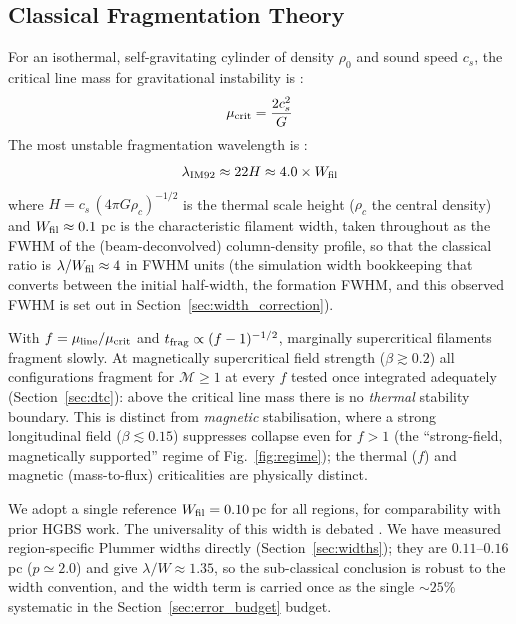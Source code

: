 \documentclass[usenatbib,twoside,twocolumn]{mnras}
\begin{document}
\subsection{Classical Fragmentation Theory}

For an isothermal, self-gravitating cylinder of density $\rho_0$ and sound speed $c_s$, the critical line mass for gravitational instability is \citep{Ostriker1964}:
\begin{equation}
\mu_{\rm crit} = \frac{2c_s^2}{G}
\end{equation}
The most unstable fragmentation wavelength is \citep{Inutsuka1992}:
\begin{equation}
\lambda_{\rm IM92} \approx 22 H \approx 4.0 \times W_{\rm fil}
\label{eq:im92}
\end{equation}
where $H = c_s\,(4\pi G\rho_c)^{-1/2}$ is the thermal scale height ($\rho_c$ the central density) and $W_{\rm fil} \approx 0.1$ pc is the characteristic filament width, taken throughout as the FWHM of the (beam-deconvolved) column-density profile, so that the classical ratio is $\lambda/W_{\rm fil}\approx4$ in FWHM units (the simulation width bookkeeping that converts between the initial half-width, the formation FWHM, and this observed FWHM is set out in Section~\ref{sec:width_correction}).

With $f=\mu_{\rm line}/\mu_{\rm crit}$ and $t_{\rm frag}\propto(f-1)^{-1/2}$, marginally supercritical filaments fragment slowly. At magnetically supercritical field strength ($\beta\gtrsim0.2$) all configurations fragment for $\mathcal{M}\geq1$ at every $f$ tested once integrated adequately (Section~\ref{sec:dtc}): above the critical line mass there is no \emph{thermal} stability boundary. This is distinct from \emph{magnetic} stabilisation, where a strong longitudinal field ($\beta\lesssim0.15$) suppresses collapse even for $f>1$ (the ``strong-field, magnetically supported'' regime of Fig.~\ref{fig:regime}); the thermal ($f$) and magnetic (mass-to-flux) criticalities are physically distinct.

We adopt a single reference $W_{\rm fil}=0.10$\,pc for all regions, for comparability with prior HGBS work. The universality of this width is debated \citep{Panopoulou2017,Panopoulou2022}. We have measured region-specific Plummer widths directly (Section~\ref{sec:widths}); they are $0.11$--$0.16$\,pc ($p\simeq2.0$) and give $\lambda/W\approx1.35$, so the sub-classical conclusion is robust to the width convention, and the width term is carried once as the single $\sim25\%$ systematic in the Section~\ref{sec:error_budget} budget.
\end{document}
